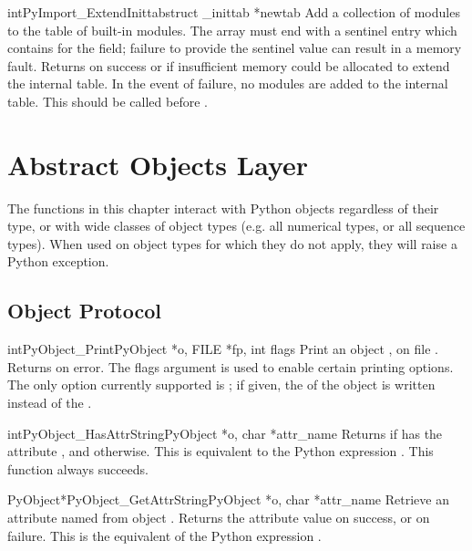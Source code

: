 \documentclass{manual}
\begin{document}
\begin{cfuncdesc}{int}{PyImport_ExtendInittab}{struct _inittab *newtab}
Add a collection of modules to the table of built-in modules.  The
 array must end with a sentinel entry which contains
\NULL{} for the  field; failure to provide the sentinel
value can result in a memory fault.  Returns  on success or
 if insufficient memory could be allocated to extend the
internal table.  In the event of failure, no modules are added to the
internal table.  This should be called before
.
\end{cfuncdesc}


\chapter{Abstract Objects Layer \label{abstract}}

The functions in this chapter interact with Python objects regardless
of their type, or with wide classes of object types (e.g. all
numerical types, or all sequence types).  When used on object types
for which they do not apply, they will raise a Python exception.

\section{Object Protocol \label{object}}

\begin{cfuncdesc}{int}{PyObject_Print}{PyObject *o, FILE *fp, int flags}
Print an object , on file .  Returns  on error.
The flags argument is used to enable certain printing options.  The
only option currently supported is ; if given,
the  of the object is written instead of the
.
\end{cfuncdesc}

\begin{cfuncdesc}{int}{PyObject_HasAttrString}{PyObject *o, char *attr_name}
Returns  if  has the attribute , and
 otherwise.  This is equivalent to the Python expression
.
This function always succeeds.
\end{cfuncdesc}

\begin{cfuncdesc}{PyObject*}{PyObject_GetAttrString}{PyObject *o,
                                                     char *attr_name}
Retrieve an attribute named  from object .
Returns the attribute value on success, or \NULL{} on failure.
This is the equivalent of the Python expression
.
\end{cfuncdesc}
\end{document}
